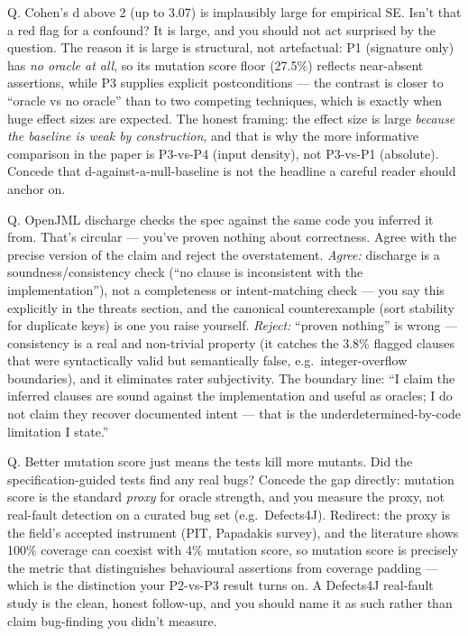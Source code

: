 \documentclass[11pt]{article}
\begin{document}
\begin{qbox}{Q. Cohen's d above 2 (up to 3.07) is implausibly large for empirical SE. Isn't that a red flag for a confound?}
It is large, and you should not act surprised by the question. The reason it is
large is structural, not artefactual: P1 (signature only) has \emph{no oracle
at all}, so its mutation score floor (27.5\%) reflects near-absent assertions,
while P3 supplies explicit postconditions --- the contrast is closer to
``oracle vs no oracle'' than to two competing techniques, which is exactly when
huge effect sizes are expected. The honest framing: the effect size is large
\emph{because the baseline is weak by construction}, and that is why the more
informative comparison in the paper is P3-vs-P4 (input density), not P3-vs-P1
(absolute). Concede that d-against-a-null-baseline is not the headline a
careful reader should anchor on.
\end{qbox}

\begin{qbox}{Q. OpenJML discharge checks the spec against the same code you inferred it from. That's circular --- you've proven nothing about correctness.}
Agree with the precise version of the claim and reject the overstatement.
\emph{Agree:} discharge is a soundness/consistency check (``no clause is
inconsistent with the implementation''), not a completeness or intent-matching
check --- you say this explicitly in the threats section, and the canonical
counterexample (sort stability for duplicate keys) is one you raise yourself.
\emph{Reject:} ``proven nothing'' is wrong --- consistency is a real and
non-trivial property (it catches the 3.8\% flagged clauses that were
syntactically valid but semantically false, e.g.\ integer-overflow boundaries),
and it eliminates rater subjectivity. The boundary line: ``I claim the inferred
clauses are sound against the implementation and useful as oracles; I do not
claim they recover documented intent --- that is the underdetermined-by-code
limitation I state.''
\end{qbox}

\begin{qbox}{Q. Better mutation score just means the tests kill more mutants. Did the specification-guided tests find any real bugs?}
Concede the gap directly: mutation score is the standard \emph{proxy} for
oracle strength, and you measure the proxy, not real-fault detection on a
curated bug set (e.g.\ Defects4J). Redirect: the proxy is the field's accepted
instrument (PIT, Papadakis survey), and the literature shows 100\% coverage can
coexist with 4\% mutation score, so mutation score is precisely the metric that
distinguishes behavioural assertions from coverage padding --- which is the
distinction your P2-vs-P3 result turns on. A Defects4J real-fault study is the
clean, honest follow-up, and you should name it as such rather than claim
bug-finding you didn't measure.
\end{qbox}
\end{document}
